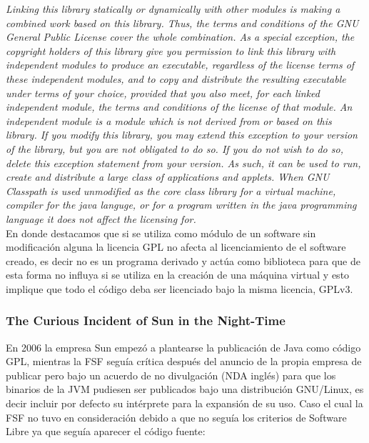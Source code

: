 \documentclass[11pt]{scrartcl}
\begin{document}
    \emph{Linking this library statically or dynamically with other modules is making a combined work based on this library. Thus, the terms and conditions of the GNU General Public License cover the whole combination.
As a special exception, the copyright holders of this library give you permission to link this library with independent modules to produce an executable, regardless of the license terms of these independent modules, and to copy and distribute the resulting executable under terms of your choice, provided that you also meet, for each linked independent module, the terms and conditions of the license of that module. An independent module is a module which is not derived from or based on this library. If you modify this library, you may extend this exception to your version of the library, but you are not obligated to do so. If you do not wish to do so, delete this exception statement from your version.
As such, it can be used to run, create and distribute a large class of applications and applets. When GNU Classpath is used unmodified as the core class library for a virtual machine, compiler for the java languge, or for a program written in the java programming language it does not affect the licensing for.}\\

En donde destacamos que si se utiliza como módulo de un software sin modificación alguna la licencia GPL no afecta al licenciamiento de el software creado, es decir no es un programa derivado y actúa como biblioteca para que de esta forma no influya si se utiliza en la creación de una máquina virtual y esto implique que todo el código deba ser licenciado bajo la misma licencia, GPLv3.

\subsubsection{The Curious Incident of Sun in the Night-Time}

En 2006 la empresa Sun empezó a plantearse la publicación de Java como código GPL, mientras la FSF seguía crítica después del anuncio de la propia empresa de publicar pero bajo un acuerdo de no divulgación (NDA inglés) para que los binarios de la JVM pudiesen ser publicados bajo una distribución GNU/Linux, es decir incluir por defecto su intérprete para la expansión de su uso. Caso el cual la FSF no tuvo en consideración debido a que no seguía los criterios de Software Libre ya que seguía aparecer el código fuente:\\
\end{document}
